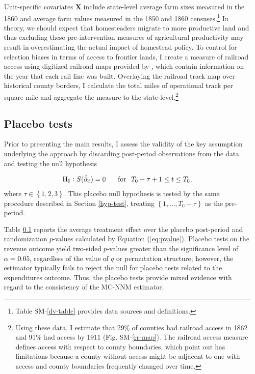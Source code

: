 \documentclass[12pt]{article}
\begin{document}
Unit-specific covariates $\mathbf{X}$ include state-level average farm sizes measured in the 1860 and average farm values measured in the 1850 and 1860 censuses.\footnote{Table SM-\ref{dv-table} provides data sources and definitions.} In theory, we should expect that homesteaders migrate to more productive land and thus excluding these pre-intervention measures of agricultural productivity may result in overestimating the actual impact of homestead policy. To control for selection biases in terms of access to frontier lands, I create a measure of railroad access using digitized railroad maps provided by \citet{atack2013use}, which contain information on the year that each rail line was built. Overlaying the railroad track map over historical county borders, I calculate the total miles of operational track per square mile and aggregate the measure to the state-level.\footnote{Using these data, I estimate that 29\% of counties had railroad access in 1862 and 91\% had access by 1911 (Fig. SM-\ref{rr-map}). The railroad access measure defines access with respect to county boundaries, which \citet{atack2012impact} point out has limitations because a county without access might be adjacent to one with access and county boundaries frequently changed over time.}

\subsection{Placebo tests} \label{placebo-tests}

Prior to presenting the main results, I assess the validity of the key assumption underlying the approach by discarding post-period observations from the data and testing the null hypothesis 

\begin{equation} \label{h0-placebo}
\text{H}_0: S (\hat{\bar{\alpha}}_{t}) = 0  \, \hspace{5mm} \,  \text{for} \, \hspace{2mm} T_0 - \tau +1 \leq t \leq T_0,
\end{equation}
where $\tau \in \left\{1, 2, 3\right\}$. This placebo null hypothesis is tested by the same procedure described in Section \ref{hyp-test}, treating $\left\{1, \ldots, T_0 - \tau\right\}$ as the pre-period.

Table \ref{placebo-tests} reports the average treatment effect over the placebo post-period and randomization $p$-values calculated by Equation (\ref{eq:pvalue}). Placebo tests on the revenue outcome yield two-sided $p$-values greater than the significance level of $\alpha = 0.05$, regardless of the value of $q$ or permutation structure; however, the estimator typically fails to reject the null for placebo tests related to the expenditures outcome. Thus, the placebo tests provide mixed evidence with regard to the consistency of the MC-NNM estimator. 
\end{document}
